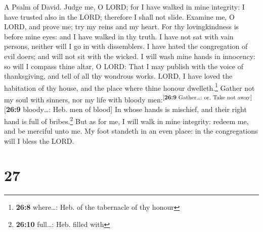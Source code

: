 A Psalm of David.  Judge me, O LORD; for I have walked in
mine integrity: I have trusted also in the LORD; therefore I shall not
slide.  Examine me, O LORD, and prove me; try my reins and
my heart.  For thy lovingkindness is before mine eyes: and
I have walked in thy truth.  I have not sat with vain
persons, neither will I go in with dissemblers.  I have
hated the congregation of evil doers; and will not sit with the wicked.
 I will wash mine hands in innocency: so will I compass
thine altar, O LORD:  That I may publish with the voice of
thanksgiving, and tell of all thy wondrous works.  LORD, I
have loved the habitation of thy house, and the place where thine honour
dwelleth.\footnote{\textbf{26:8} where\ldots: Heb. of the tabernacle of
  thy honour}  Gather not my soul with sinners, nor my
life with bloody men:\textsuperscript{{[}\textbf{26:9} Gather\ldots: or,
Take not away{]}}{[}\textbf{26:9} bloody\ldots: Heb. men of blood{]}
 In whose hands is mischief, and their right hand is full
of bribes.\footnote{\textbf{26:10} full\ldots: Heb. filled with}
 But as for me, I will walk in mine integrity: redeem me,
and be merciful unto me.  My foot standeth in an even
place: in the congregations will I bless the LORD.

\hypertarget{section-26}{%
\section{27}\label{section-26}}

